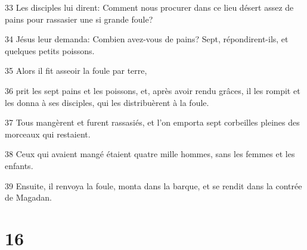 \par 33 Les disciples lui dirent: Comment nous procurer dans ce lieu désert assez de pains pour rassasier une si grande foule?
\par 34 Jésus leur demanda: Combien avez-vous de pains? Sept, répondirent-ils, et quelques petits poissons.
\par 35 Alors il fit asseoir la foule par terre,
\par 36 prit les sept pains et les poissons, et, après avoir rendu grâces, il les rompit et les donna à ses disciples, qui les distribuèrent à la foule.
\par 37 Tous mangèrent et furent rassasiés, et l'on emporta sept corbeilles pleines des morceaux qui restaient.
\par 38 Ceux qui avaient mangé étaient quatre mille hommes, sans les femmes et les enfants.
\par 39 Ensuite, il renvoya la foule, monta dans la barque, et se rendit dans la contrée de Magadan.

\chapter{16}

